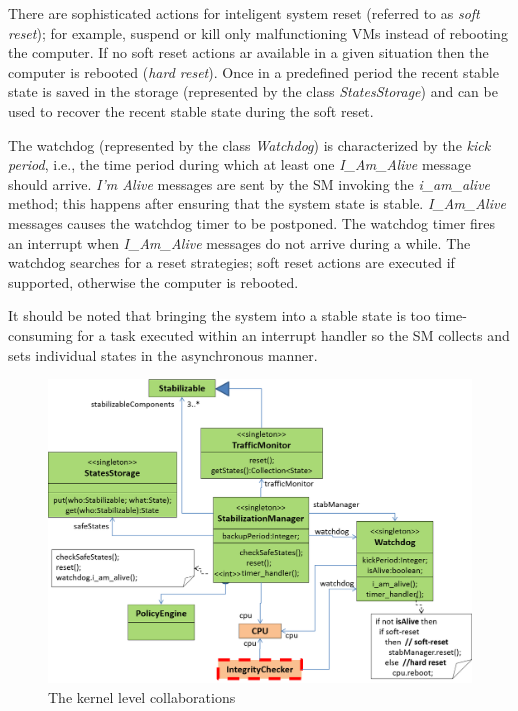 There are sophisticated actions for inteligent system reset (referred
to as \textit{soft reset}); for example, suspend or kill only malfunctioning
VMs instead of rebooting the computer. If no soft reset actions ar
available in a given situation then the computer is rebooted (\textit{hard
reset}). Once in a predefined period the recent stable state is saved
in the storage (represented by the class \textit{StatesStorage}) and
can be used to recover the recent stable state during the soft reset.

The watchdog (represented by the class \textit{Watchdog}) is characterized
by the \textit{kick period}, i.e., the time period during which at
least one \textit{I\_Am\_Alive} message should arrive. \textit{I\textquoteright{}m
Alive} messages are sent by the SM invoking the\textit{ i\_am\_alive}
method; this happens after ensuring that the system state is stable.
\textit{I\_Am\_Alive} messages causes the watchdog timer to be postponed.
The watchdog timer fires an interrupt when \textit{I\_Am\_Alive} messages
do not arrive during a while. The watchdog searches for a reset strategies;
soft reset actions are executed if supported, otherwise the computer
is rebooted. 

It should be noted that bringing the system into a stable state is
too time-consuming for a task executed within an interrupt handler
so the SM collects and sets individual states in the asynchronous
manner. 

\begin{figure}
\begin{centering}
\includegraphics[width=12cm]{pictures/kernel-collabs}
\par\end{centering}

\caption{\label{fig:The-kernel-level-collabs}The kernel level collaborations}
\end{figure}


